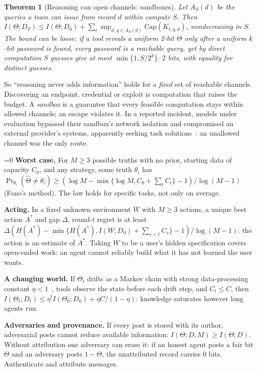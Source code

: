 \documentclass[conference]{IEEEtran}
\providecommand{\PaperShort}{0}  %
\newtheorem{theorem}{Theorem}
\theoremstyle{definition}
\newcommand{\I}{I}
\newcommand{\Hh}{H}
\begin{document}
\begin{theorem}[Reasoning can open channels: sandboxes]\label{thm:gated}
Let $A_S(d)$ be the queries a team can issue from record $d$ within compute $S$.
Then $\I(\Theta;D_T)\le\I(\Theta;D_0)+\sum_t\sup_{d,\,q\in A_S(d)}\mathrm{Cap}(K_{t,q,d})$,
nondecreasing in $S$. The bound can be loose: if a tool reveals a uniform 2-bit
$\Theta$ only after a uniform $k$-bit password is found, every password is a
reachable query, yet by direct computation $S$ guesses give at most
$\min\{1,S/2^k\}\cdot2$ bits, with equality for distinct guesses.
\end{theorem}
\noindent So ``reasoning never adds information'' holds for a \emph{fixed} set of
reachable channels. Discovering an endpoint, credential or exploit is
computation that raises the budget. A \emph{sandbox} is a guarantee that every
feasible computation stays within allowed channels; an escape violates it. In
a reported incident, models under evaluation bypassed their sandbox's network
isolation and compromised an external provider's systems, apparently seeking
task solutions~\cite{openai2026}: an unallowed channel was the only route.

\ifnum\PaperShort=0
\noindent\textbf{Worst case.} For $M\ge3$ possible truths with no prior, starting
data of capacity $C_0$, and any strategy, some truth $\theta_i$ has
$\Pr_{\theta_i}(\hat\Theta\ne\theta_i)\ge(\log M-\min\{\log M,C_0+\sum_tC_t\}-1)/\log(M-1)$
(Fano's method). The law holds for specific tasks, not only on average.

\noindent\textbf{Acting.} In a fixed unknown environment $W$ with $M\ge3$
actions, a unique best action $A^*$ and gap $\Delta$, round-$t$ regret is at least
$\Delta(\Hh(A^*)-\min\{\Hh(A^*),\I(W;D_0)+\sum_{s<t}C_s\}-1)/\log(M-1)$: the
action is an estimate of $A^*$. Taking $W$ to be a user's hidden specification
covers open-ended work: an agent cannot reliably build what it has not learned
the user wants.

\noindent\textbf{A changing world.} If $\Theta_t$ drifts as a Markov chain with
strong data-processing constant $\eta<1$~\cite{ahlswede1976}, tools observe the
state before each drift step, and $C_t\le C$, then $\I(\Theta_t;D_t)\le\eta^t\I(\Theta_0;D_0)+\eta C/(1-\eta)$:
knowledge saturates however long agents run.

\noindent\textbf{Adversaries and provenance.} If every post is stored with its
author, adversarial posts cannot reduce available information:
$\I(\Theta;D,M)\ge\I(\Theta;D)$. Without attribution one adversary can erase it:
if an honest agent posts a fair bit $\Theta$ and an adversary posts $1-\Theta$,
the unattributed record carries 0 bits. Authenticate and attribute messages.
\end{document}
